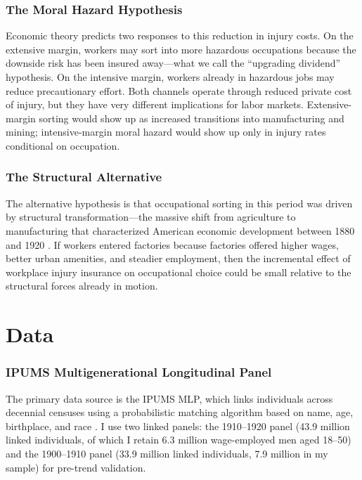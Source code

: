 \documentclass[12pt]{article}
\begin{document}
\subsubsection*{The Moral Hazard Hypothesis} Economic theory predicts two responses to this reduction in injury costs. On the extensive margin, workers may sort into more hazardous occupations because the downside risk has been insured away---what we call the ``upgrading dividend'' hypothesis. On the intensive margin, workers already in hazardous jobs may reduce precautionary effort. Both channels operate through reduced private cost of injury, but they have very different implications for labor markets. Extensive-margin sorting would show up as increased transitions into manufacturing and mining; intensive-margin moral hazard would show up only in injury rates conditional on occupation.

\subsubsection*{The Structural Alternative} The alternative hypothesis is that occupational sorting in this period was driven by structural transformation---the massive shift from agriculture to manufacturing that characterized American economic development between 1880 and 1920 \citep{goldin2000}. If workers entered factories because factories offered higher wages, better urban amenities, and steadier employment, then the incremental effect of workplace injury insurance on occupational choice could be small relative to the structural forces already in motion.


\section{Data}\label{sec:data}

\subsubsection*{IPUMS Multigenerational Longitudinal Panel} The primary data source is the IPUMS MLP, which links individuals across decennial censuses using a probabilistic matching algorithm based on name, age, birthplace, and race \citep{helgertz2023}. I use two linked panels: the 1910--1920 panel (43.9 million linked individuals, of which I retain 6.3 million wage-employed men aged 18--50) and the 1900--1910 panel (33.9 million linked individuals, 7.9 million in my sample) for pre-trend validation.
\end{document}
